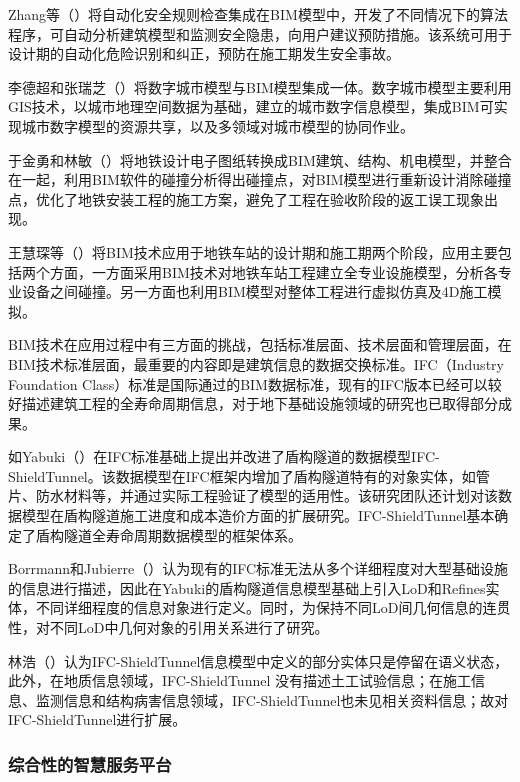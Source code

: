 Zhang等（\citeyear{zhang2013building}）将自动化安全规则检查集成在BIM模型中，开发了不同情况下的算法程序，可自动分析建筑模型和监测安全隐患，向用户建议预防措施。该系统可用于设计期的自动化危险识别和纠正，预防在施工期发生安全事故。

李德超和张瑞芝（\citeyear{李德超2012bim}）将数字城市模型与BIM模型集成一体。数字城市模型主要利用GIS技术，以城市地理空间数据为基础，建立的城市数字信息模型，集成BIM可实现城市数字模型的资源共享，以及多领域对城市模型的协同作业。

于金勇和林敏（\citeyear{于金勇2013bim}）将地铁设计电子图纸转换成BIM建筑、结构、机电模型，并整合在一起，利用BIM软件的碰撞分析得出碰撞点，对BIM模型进行重新设计消除碰撞点，优化了地铁安装工程的施工方案，避免了工程在验收阶段的返工误工现象出现。

王慧琛等（\citeyear{王慧琛2013bim}）将BIM技术应用于地铁车站的设计期和施工期两个阶段，应用主要包括两个方面，一方面采用BIM技术对地铁车站工程建立全专业设施模型，分析各专业设备之间碰撞。另一方面也利用BIM模型对整体工程进行虚拟仿真及4D施工模拟。

BIM技术在应用过程中有三方面的挑战，包括标准层面、技术层面和管理层面，在BIM技术标准层面，最重要的内容即是建筑信息的数据交换标准。IFC（Industry Foundation Class）标准是国际通过的BIM数据标准，现有的IFC版本已经可以较好描述建筑工程的全寿命周期信息，对于地下基础设施领域的研究也已取得部分成果。

如Yabuki（\citeyear{yabuki2013development}）在IFC标准基础上提出并改进了盾构隧道的数据模型IFC-ShieldTunnel。该数据模型在IFC框架内增加了盾构隧道特有的对象实体，如管片、防水材料等，并通过实际工程验证了模型的适用性。该研究团队还计划对该数据模型在盾构隧道施工进度和成本造价方面的扩展研究。IFC-ShieldTunnel基本确定了盾构隧道全寿命周期数据模型的框架体系。

Borrmann和Jubierre（\citeyear{borrmann2013multi}）认为现有的IFC标准无法从多个详细程度对大型基础设施的信息进行描述，因此在Yabuki的盾构隧道信息模型基础上引入LoD和Refines实体，不同详细程度的信息对象进行定义。同时，为保持不同LoD间几何信息的连贯性，对不同LoD中几何对象的引用关系进行了研究。 

林浩（\citeyear{林浩2016基于}）认为IFC-ShieldTunnel信息模型中定义的部分实体只是停留在语义状态，此外，在地质信息领域，IFC-ShieldTunnel 没有描述土工试验信息；在施工信息、监测信息和结构病害信息领域，IFC-ShieldTunnel也未见相关资料信息；故对IFC-ShieldTunnel进行扩展。

\subsubsection{综合性的智慧服务平台}

